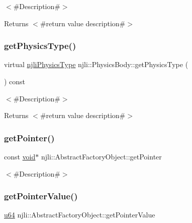 $<$\#\+Description\#$>$

\begin{DoxyReturn}{Returns}
$<$\#return value description\#$>$ 
\end{DoxyReturn}
\mbox{\label{classnjli_1_1_physics_body_aaed92388b5924746fbd38b87d3bc66b6}} 
\subsubsection{\texorpdfstring{get\+Physics\+Type()}{getPhysicsType()}}
{\footnotesize\ttfamily virtual \mbox{\hyperlink{namespacenjli_a60ba626f4609f81870c92d042c6bc83d}{njli\+Physics\+Type}} njli\+::\+Physics\+Body\+::get\+Physics\+Type (\begin{DoxyParamCaption}{ }\end{DoxyParamCaption}) const\hspace{0.3cm}{\ttfamily [virtual]}}

$<$\#\+Description\#$>$

\begin{DoxyReturn}{Returns}
$<$\#return value description\#$>$ 
\end{DoxyReturn}
\mbox{\label{classnjli_1_1_physics_body_ac4ca71716ed832be357f15f8262c8448}} 
\subsubsection{\texorpdfstring{get\+Pointer()}{getPointer()}}
{\footnotesize\ttfamily const \mbox{\hyperlink{_thread_8h_af1e856da2e658414cb2456cb6f7ebc66}{void}}$\ast$ njli\+::\+Abstract\+Factory\+Object\+::get\+Pointer}

$<$\#\+Description\#$>$ \mbox{\label{classnjli_1_1_physics_body_a4ffddf141a426a5a07d0ac19f1913811}} 
\subsubsection{\texorpdfstring{get\+Pointer\+Value()}{getPointerValue()}}
{\footnotesize\ttfamily \mbox{\hyperlink{_util_8h_ad758b7a5c3f18ed79d2fcd23d9f16357}{u64}} njli\+::\+Abstract\+Factory\+Object\+::get\+Pointer\+Value}


